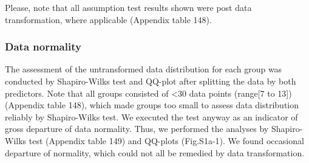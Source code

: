 \documentclass[
  12pt,
  letterpaper,
]{article}
\begin{document}
Please, note that all assumption test results shown were post data transformation, where applicable (Appendix table 148).

\subsubsection{Data normality}\label{data-normality-5}

The assessment of the untransformed data distribution for each group was conducted by Shapiro-Wilks test and QQ-plot after splitting the data by both predictors. Note that all groups consisted of \textless30 data points (range{[}7 to 13{]}) (Appendix table 148), which made groups too small to assess data distribution reliably by Shapiro-Wilks test. We executed the test anyway as an indicator of gross departure of data normality. Thus, we performed the analyses by Shapiro-Wilks test (Appendix table 149) and QQ-plots (Fig.S1a-1). We found occasional departure of normality, which could not all be remedied by data transformation.
\end{document}
